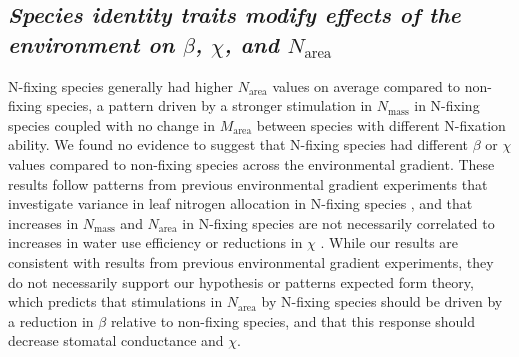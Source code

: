 \subsection{\textit{Species identity traits modify effects of the environment on $\beta$, $\chi$, and $N_\mathrm{area}$}}
N-fixing species generally had higher $N_\mathrm{area}$ values on average compared to non-fixing species, a pattern driven by a stronger stimulation in $N_\mathrm{mass}$ in N-fixing species coupled with no change in $M_\mathrm{area}$ between species with different N-fixation ability. We found no evidence to suggest that N-fixing species had different $\beta$ or $\chi$ values compared to non-fixing species across the environmental gradient. These results follow patterns from previous environmental gradient experiments that investigate variance in leaf nitrogen allocation in N-fixing species , and that increases in $N_\mathrm{mass}$ and $N_\mathrm{area}$ in N-fixing species are not necessarily correlated to increases in water use efficiency or reductions in $\chi$ . While our results are consistent with results from previous environmental gradient experiments, they do not necessarily support our hypothesis or patterns expected form theory, which predicts that stimulations in $N_\mathrm{area}$ by N-fixing species should be driven by a reduction in $\beta$ relative to non-fixing species, and that this response should decrease stomatal conductance and $\chi$.

